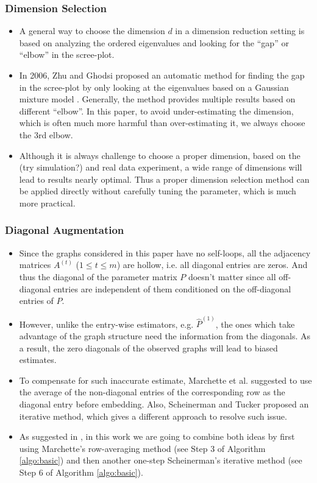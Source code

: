 \documentclass[a4paper]{article}
\renewcommand{\hat}{\widehat}
\begin{document}
\subsubsection{Dimension Selection}
\label{section:dim_select}
\begin{itemize}
\item A general way to choose the dimension $d$ in a dimension reduction setting is based on analyzing the ordered eigenvalues and looking for the ``gap'' or ``elbow'' in the scree-plot.
\item In 2006, Zhu and Ghodsi proposed an automatic method for finding the gap in the scree-plot by only looking at the eigenvalues based on a Gaussian mixture model \cite{zhu2006automatic}. Generally, the method provides multiple results based on different ``elbow''. In this paper, to avoid under-estimating the dimension, which is often much more harmful than over-estimating it, we always choose the 3rd elbow.
\item Although it is always challenge to choose a proper dimension, based on the (try simulation?) and real data experiment, a wide range of dimensions will lead to results nearly optimal. Thus a proper dimension selection method can be applied directly without carefully tuning the parameter, which is much more practical.
\end{itemize}


\subsubsection{Diagonal Augmentation}
\label{section:diag_aug}
\begin{itemize}
\item Since the graphs considered in this paper have no self-loops, all the adjacency matrices $A^{(t)}$ ($1 \le t \le m$) are hollow, i.e. all diagonal entries are zeros. And thus the diagonal of the parameter matrix $P$ doesn't matter since all off-diagonal entries are independent of them conditioned on the off-diagonal entries of $P$.
\item However, unlike the entry-wise estimators, e.g. $\hat{P}^{(1)}$, the ones which take advantage of the graph structure need the information from the diagonals. As a result, the zero diagonals of the observed graphs will lead to biased estimates. 
\item To compensate for such inaccurate estimate, Marchette et al. \cite{marchette2011vertex} suggested to use the average of the non-diagonal entries of the corresponding row as the diagonal entry before embedding. Also, Scheinerman and Tucker \cite{scheinerman2010modeling} proposed an iterative method, which gives a different approach to resolve such issue.
\item As suggested in \cite{tang2016law}, in this work we are going to combine both ideas by first using Marchette's row-averaging method (see Step 3 of Algorithm \ref{algo:basic}) and then another one-step Scheinerman's iterative method (see Step 6 of Algorithm \ref{algo:basic}).
\end{itemize}
\end{document}
